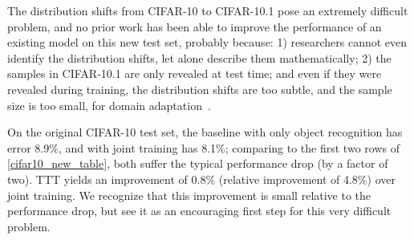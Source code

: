 

The distribution shifts from CIFAR-10 to CIFAR-10.1 pose an extremely difficult problem, and no prior work has been able to improve the performance of an existing model on this new test set, 
probably because:
1) researchers cannot even identify the distribution shifts, let alone describe them mathematically; 
2) the samples in CIFAR-10.1 are only revealed at test time; and even if they were revealed during training, the distribution shifts are too subtle, and the sample size is too small, for domain adaptation~\citep{recht2018cifar}.

On the original CIFAR-10 test set, the baseline with only object recognition has error 8.9\%,
and with joint training has 8.1\%;
comparing to the first two rows of \autoref{cifar10_new_table}, 
both suffer the typical performance drop (by a factor of two). 
TTT yields an improvement of 0.8\%
(relative improvement of 4.8\%) over joint training.
We recognize that this improvement is small relative to the performance drop, but see it as an encouraging first step for this very difficult problem.
